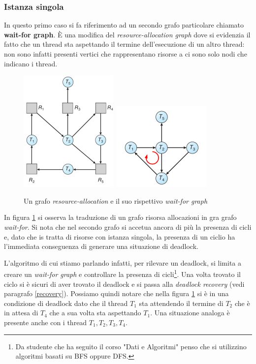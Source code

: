 \subsubsection{Istanza singola}
In questo primo caso si fa riferimento ad un secondo grafo particolare chiamato \textbf{wait-for graph}. È una modifica del \textit{resource-allocation graph} dove si evidenzia il fatto che un thread sta aspettando il termine dell'esecuzione di un altro thread: non sono infatti presenti vertici che rappresentano risorse a ci sono solo nodi che indicano i thread.
\begin{figure}[h]
    \centering
    \includegraphics[width = .25\textwidth]{../res/imgs/deadlocks/unsafe.png}
    \hspace{10pt}
    \includegraphics[width = .35\textwidth]{../res/imgs/deadlocks/wait-for_graph.png}
    \caption{Un grafo \textit{resource-allocation} e il suo rispettivo \textit{wait-for graph}}
    \label{fig:wait-for}
\end{figure}
In figura \ref{fig:wait-for} si osserva la traduzione di un grafo risorsa allocazioni in gra grafo \textit{wait-for}. Si nota che nel secondo grafo si accetua ancora di più la presenza di cicli e, dato che is tratta di risorse con istanza singola, la presenza di un ciclio ha l'immediata conseguenza di generare una situazione di deadlock.

L'algoritmo di cui stiamo parlando infatti, per rilevare un deadlock, si limita a creare un \textit{wait-for graph} e controllare la presenza di cicli\footnote{Da studente che ha seguito il corso "Dati e Algoritmi" penso che si utilizzino algoritmi basati su BFS oppure DFS.}. Una volta trovato il ciclo si è sicuri di aver trovato il deadlock e si passa alla \textit{deadlock recovery} (vedi paragrafo \ref{recovery}). Possiamo quindi notare che nella figura \ref{fig:wait-for} si è in una condizione di deadlock dato che il thread $T_1$ sta attendendo il termine di $T_2$ che è in attesa di $T_4$ che a sua volta sta aspettando $T_1$. Una situazione analoga è presente anche con i thread $T_1,T_2,T_3,T_4$.
% 
